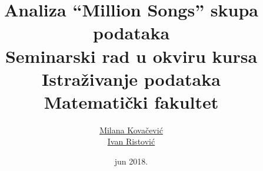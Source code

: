 \documentclass[a4paper]{article}
\begin{document}
\title{Analiza ``Million Songs'' skupa podataka\\ \small{Seminarski rad u okviru kursa\\Istra\v{z}ivanje podataka\\ Matematički fakultet}}

\author{\href{mailto:mi14031@matf.bg.ac.rs}{Milana Kova\v{c}evi\'c}\\\href{mailto:mi14042@matf.bg.ac.rs}{Ivan Ristovi\'c}}
\date{jun 2018.}

\maketitle



\tableofcontents

\newpage













\newpage

\begin{appendices}


\end{appendices}
\end{document}

